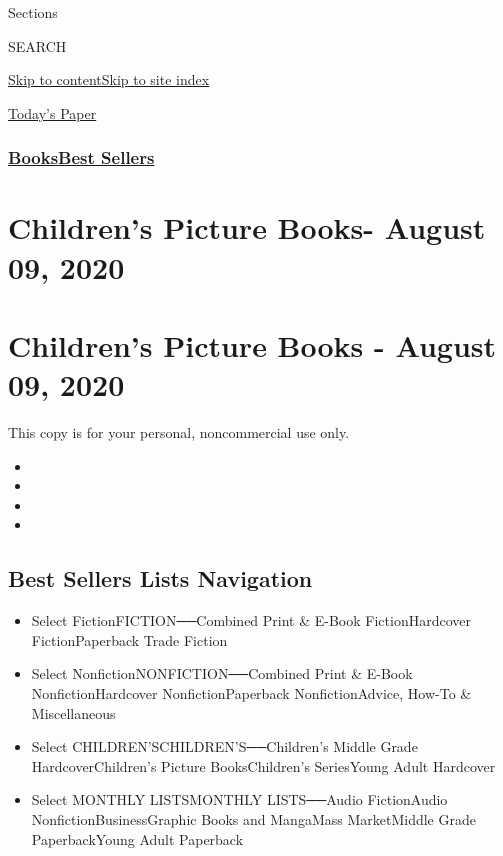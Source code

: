 Sections

SEARCH

\protect\hyperlink{site-content}{Skip to
content}\protect\hyperlink{site-index}{Skip to site index}

\href{https://myaccount.nytimes3xbfgragh.onion/auth/login?response_type=cookie\&client_id=vi}{}

\href{https://www.nytimes3xbfgragh.onion/section/todayspaper}{Today's
Paper}

\hypertarget{booksbest-sellers}{%
\subsubsection{\texorpdfstring{\href{/section/books/}{Books}\textbar{}\href{/books/best-sellers/}{Best
Sellers}}{Books\textbar{}Best Sellers}}\label{booksbest-sellers}}

\hypertarget{childrens-picture-books--august-09-2020}{%
\section{Children's Picture Books- August 09,
2020}\label{childrens-picture-books--august-09-2020}}

\hypertarget{childrens-picture-books---august-09-2020}{%
\section{Children's Picture Books - August 09,
2020}\label{childrens-picture-books---august-09-2020}}

This copy is for your personal, noncommercial use only.

\begin{itemize}
\item
\item
\item
\item
\end{itemize}

\hypertarget{best-sellers-lists-navigation}{%
\subsection{Best Sellers Lists
Navigation}\label{best-sellers-lists-navigation}}

\begin{itemize}
\tightlist
\item
  Select FictionFICTION──Combined Print \& E-Book FictionHardcover
  FictionPaperback Trade Fiction
\item
  Select NonfictionNONFICTION──Combined Print \& E-Book
  NonfictionHardcover NonfictionPaperback NonfictionAdvice, How-To \&
  Miscellaneous
\item
  Select CHILDREN'SCHILDREN'S──Children's Middle Grade
  HardcoverChildren's Picture BooksChildren's SeriesYoung Adult
  Hardcover
\item
  Select MONTHLY LISTSMONTHLY LISTS──Audio FictionAudio
  NonfictionBusinessGraphic Books and MangaMass MarketMiddle Grade
  PaperbackYoung Adult Paperback
\end{itemize}

